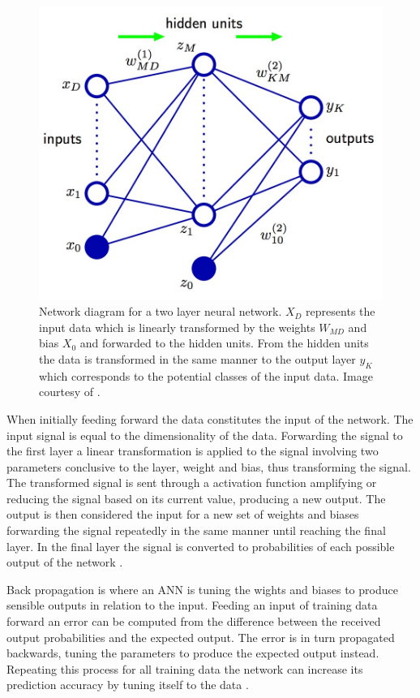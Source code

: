 \begin{figure}[ht!]
  \centering
  \includegraphics[width=0.7\linewidth]{images/ANN_representation.jpg}
  \caption[]
  {\small Network diagram for a two layer neural network. $X_D$ represents the input data which is linearly transformed by the weights $W_{MD}$ and bias $X_0$ and forwarded to the hidden units. From the hidden units the data is transformed in the same manner to the output layer $y_K$ which corresponds to the potential classes of the input data. Image courtesy of \textcite{Bishop:2006}.}
  \label{fig:ANN_representation}
\end{figure}


When initially feeding forward the data constitutes the input of the network. The input signal is equal to the dimensionality of the data. Forwarding the signal to the first layer a linear transformation is applied to the signal involving two parameters conclusive to the layer, weight and bias, thus transforming the signal. The transformed signal is sent through a activation function amplifying or reducing the signal based on its current value, producing a new output. The output is then considered the input for a new set of weights and biases forwarding the signal repeatedly in the same manner until reaching the final layer. In the final layer the signal is converted to probabilities of each possible output of the network \parencite{Bishop:2006}.

Back propagation is where an ANN is tuning the wights and biases to produce sensible outputs in relation to the input. Feeding an input of training data forward an error can be computed from the difference between the received output probabilities and the expected output. The error is in turn propagated backwards, tuning the parameters to produce the expected output instead. Repeating this process for all training data the network can increase its prediction accuracy by tuning itself to the data \parencite{Bishop:2006}.

